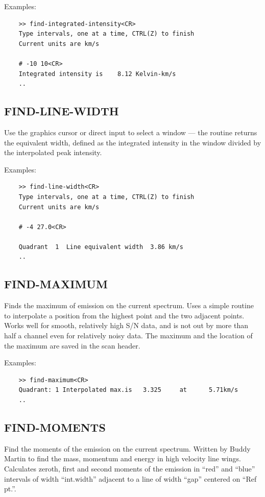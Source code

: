 \documentclass[11pt,twoside]{report}
\begin{document}
Examples:
\begin{verbatim}
    >> find-integrated-intensity<CR>
    Type intervals, one at a time, CTRL(Z) to finish
    Current units are km/s

    # -10 10<CR>
    Integrated intensity is    8.12 Kelvin-km/s
    ..
\end{verbatim}

\subsection{FIND-LINE-WIDTH} 

Use the
graphics cursor or direct input to select a window ---
the routine returns the equivalent width, defined as the integrated
intensity in the window divided by the interpolated peak intensity.

Examples:
\begin{verbatim}
    >> find-line-width<CR>
    Type intervals, one at a time, CTRL(Z) to finish
    Current units are km/s

    # -4 27.0<CR>

    Quadrant  1  Line equivalent width  3.86 km/s
    ..
\end{verbatim}

\subsection{FIND-MAXIMUM} 

Finds the maximum of emission on the current spectrum. Uses a simple
routine to interpolate a position from the highest point and the two
adjacent points. Works well for smooth, relatively high S/N data, and is
not out by more than half a channel even for relatively noisy data.
The maximum and the location of the maximum are saved in the scan header.

Examples:
\begin{verbatim}
    >> find-maximum<CR>
    Quadrant: 1 Interpolated max.is   3.325     at      5.71km/s
    ..
\end{verbatim}

\subsection{FIND-MOMENTS} 

Find the moments of the emission on the current spectrum. Written by
Buddy Martin to find the mass, momentum and energy in high velocity line
wings. Calculates zeroth, first and second moments of the emission
in ``red'' and ``blue'' intervals of width ``int.width'' adjacent to
a line of width ``gap'' centered on ``Ref pt.''.
\end{document}
